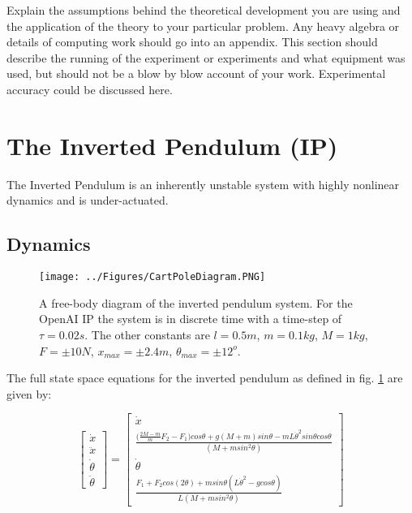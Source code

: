 \documentclass[main.tex]{subfiles}
\begin{document}
Explain the assumptions behind the theoretical development you are using and the application of the theory to your particular problem. Any heavy algebra or details of computing work should go into an appendix.
This section should describe the running of the experiment or experiments and what equipment was used, but should not be a blow by blow account of your work. Experimental accuracy could be discussed here.

\section{The Inverted Pendulum (IP)}
The Inverted Pendulum is an inherently unstable system with highly nonlinear dynamics and is under-actuated.

\subsection{Dynamics}

\begin{figure}[ht]
    \centering
    \texttt{[image: ../Figures/CartPoleDiagram.PNG]}
    \caption{A free-body diagram of the inverted pendulum system. For the OpenAI IP the system is in discrete time with a time-step of $\tau =  0.02s$. The other constants are $l = 0.5m$, $m=0.1kg$, $M=1kg$, $F=\pm10N$, $x_{max}=\pm 2.4m$, $\theta_{max} = \pm 12^o$.}
    \label{fig:invpen}
\end{figure}

The full state space equations for the inverted pendulum as defined in fig. \ref{fig:invpen} are given by:

\begin{equation}
\begin{bmatrix} \dot{x} \\ \ddot{x} \\ \dot{\theta} \\ \ddot{\theta} \end{bmatrix}  =
\begin{bmatrix} \dot{x} \\ \frac{\big(\frac{2M-m}{m}F_2-F_1\big)cos\theta + g(M+m)sin\theta - mL\dot{\theta}^2 sin\theta cos\theta}{(M + m sin^2\theta)} \\ \dot{\theta} \\ \frac{F_1 + F_2cos(2\theta)+ msin\theta(L\dot{\theta}^2-g cos\theta)}{L(M+m sin^2\theta)} \end{bmatrix} 
\end{equation}
\end{document}
